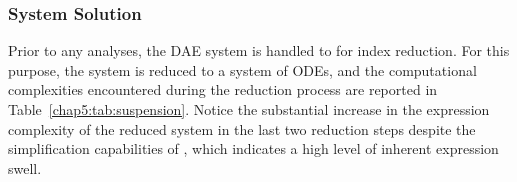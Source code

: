 \subsubsection{System Solution}

Prior to any analyses, the \ac{DAE} system is handled to \Indigo{} for index reduction. For this purpose, the system is reduced to a system of \acp{ODE}, and the computational complexities encountered during the reduction process are reported in Table~\ref{chap5:tab:suspension}. Notice the substantial increase in the expression complexity of the reduced system in the last two reduction steps despite the simplification capabilities of \Maple{}, which indicates a high level of inherent expression swell.

\begin{table}
  \caption{Expression complexity encountered throughout the index reduction with the aid of hierarchical representation of the double-wishbone suspension system \ac{DAE} system. \emph{Legend}: $\cf$ = functions, $\cv$ = veiling variables, $\ca$ = additions, $\cm$ = multiplications, and $\cd$ = divisions.}
  \label{chap5:tab:suspension}
  \centering
  \setlength{\tabcolsep}{0.25em}
\end{table}
